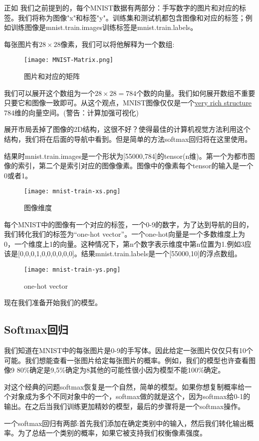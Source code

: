 正如 我们之前提到的，每个MNIST数据有两部分：手写数字的图片和对应的标签。我们将称为图像"x"和标签"y"。训练集和测试机都包含图像和对应的标签；例如训练图像是mnist.train.images训练标签是mnist.train.labels。

每张图片有$28\times28$像素，我们可以将他解释为一个数组:
\begin{figure}[H]
\centering
\texttt{[image: MNIST-Matrix.png]}
\caption{图片和对应的矩阵}
\end{figure}
我们可以展开这个数组为一个$28\times28=784$个数的向量。我们如何展开数组不重要只要它和图像一致即可。从这个观点，MNIST图像仅仅是一个\href{https://colah.github.io/posts/2014-10-Visualizing-MNIST/}{very rich structure }784维的向量空间。(警告：计算加强可视化)

展开市局丢掉了图像的2D结构，这很不好？使得最佳的计算机视觉方法利用这个结构，我们将在后面的导航中看到。但是简单的方法softmax回归将在这里使用。

结果时mnist.train.images是一个形状为[55000,784]的tensor(n维)。第一个为都市图像的索引，第二个是索引对应的图像像素。图像中的像素每个tensor的输入是一个0或者1。
\begin{figure}[H]
\centering
\texttt{[image: mnist-train-xs.png]}
\caption{图像维度}
\end{figure}
每个MNIST中的图像有一个对应的标签，一个0-9的数字，为了达到导航的目的，我们转化我们的标签为“one-hot vector”。一个one-hot向量是一个多数维度上为0，一个维度上1的向量。这种情况下，第n个数字表示维度中第n位置为1.例如3应该是[0,0,0,1,0,0,0,0,0,0]。结果mnist.train.labels是一个[55000,10]的浮点数组。
\begin{figure}[H]
\centering
\texttt{[image: mnist-train-ys.png]}
\caption{one-hot vector}
\end{figure}
现在我们准备开始我们的模型。
\subsection{Softmax回归}
我们知道在MNIST中的每张图片是0-9的手写体。因此给定一张图片仅仅只有10个可能。我们想能查看一张图片给定每张图片的概率。例如，我们的模型也许查看图像9 80\%确定是9,5\%确定为8其他的可能性很小因为模型不能100\%确定。

对这个经典的问题softmax恢复是一个自然，简单的模型。如果你想复制概率给一个对象成为多个不同对象中的一个，softmax做的就是这个，因为softmax给0-1的输出。在之后当我们训练更加精妙的模型，最后的步骤将是一个softmax操作。

一个softmax回归有两部:首先我们添加在确定类别中的输入，然后我们转化输出概率。为了总结一个类别的概率，如果它被支持我们权衡像素强度。

